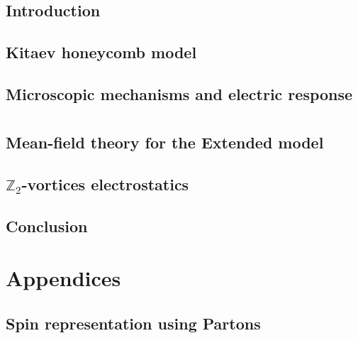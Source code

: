 \part{ }
\fontsize{13}{14}\selectfont
\chapter{Introduction}%
\label{ch:intro}%

\chapter{Kitaev honeycomb model}%
\label{ch:kitaev}%

\chapter{Microscopic mechanisms and electric response }\label{ch:micro}%


\part{}\nopagebreak
\chapter{Mean-field theory for the Extended model }%
\label{ch:KMF}%

\chapter[Vison electrostatics]{{$\mathbb{Z}_2$}-vortices electrostatics }%
\label{ch:Z2}%


\chapter{Conclusion}%


\part{Appendices}%

\appendix
\chapter{Spin representation using Partons}%
\label{App-Parton}%

